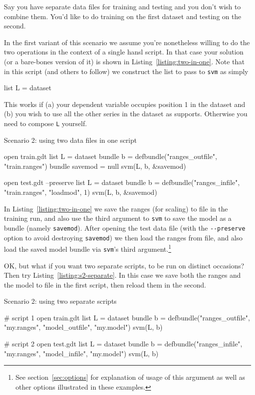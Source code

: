 \documentclass{article}
\begin{document}
Say you have separate data files for training and testing and you
don't wish to combine them. You'd like to do training on the first
dataset and testing on the second.

In the first variant of this scenario we assume you're nonetheless
willing to do the two operations in the context of a single hansl
script. In that case your solution (or a bare-bones version of it) is
shown in Listing~\ref{listing:two-in-one}. Note that in this script
(and others to follow) we construct the list to pass to \texttt{svm}
as simply
\begin{code}
list L = dataset
\end{code}
This works if (a) your dependent variable occupies position 1 in the
dataset and (b) you wish to use all the other series in the dataset as
supports. Otherwise you need to compose \texttt{L} yourself.

\begin{script}[htbp]
  \caption{Scenario 2: using two data files in one script}
  \label{listing:two-in-one}
\begin{scode}
open train.gdt
list L = dataset
bundle b = defbundle("ranges_outfile", "train.ranges")
bundle savemod = null
svm(L, b, &savemod)

open test.gdt --preserve
list L = dataset
bundle b = defbundle("ranges_infile", "train.ranges", "loadmod", 1)
svm(L, b, &savemod)
\end{scode}
\end{script}

In Listing~\ref{listing:two-in-one} we save the ranges (for scaling)
to file in the training run, and also use the third argument to
\texttt{svm} to save the model as a bundle (namely
\texttt{savemod}). After opening the test data file (with the
\verb|--preserve| option to avoid destroying \texttt{savemod}) we then
load the ranges from file, and also load the saved model bundle via
\texttt{svm}'s third argument.\footnote{See section~\ref{sec:options}
  for explanation of usage of this argument as well as other options
  illustrated in these examples.}

OK, but what if you want two separate scripts, to be run on distinct
occasions? Then try Listing~\ref{listing:s2-separate}. In this case we
save both the ranges and the model to file in the first script, then
reload them in the second.

\begin{script}[htbp]
  \caption{Scenario 2: using two separate scripts}
  \label{listing:s2-separate}
\begin{scode}
# script 1
open train.gdt
list L = dataset
bundle b = defbundle("ranges_outfile", "my.ranges", "model_outfile", "my.model")
svm(L, b)

# script 2
open test.gdt
list L = dataset
bundle b = defbundle("ranges_infile", "my.ranges", "model_infile", "my.model")
svm(L, b)
\end{scode}
\end{script}
\end{document}
